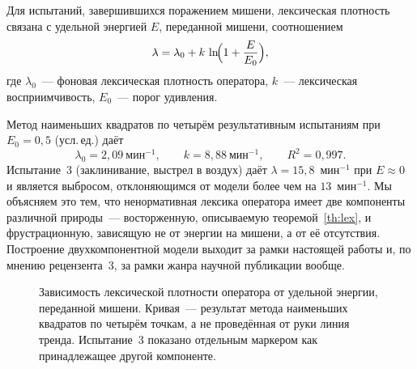 \documentclass[11pt,a4paper]{article}
\begin{document}
\begin{theorem}\label{th:lex}
Для испытаний, завершившихся поражением мишени, лексическая плотность связана с удельной энергией $E$, переданной мишени, соотношением
\[
\lambda=\lambda_0+k\,\ln\!\Bigl(1+\frac{E}{E_0}\Bigr),
\]
где $\lambda_0$~--- фоновая лексическая плотность оператора, $k$~--- лексическая восприимчивость, $E_0$~--- порог удивления.
\end{theorem}

Метод наименьших квадратов по четырём результативным испытаниям при $E_0=0{,}5$ (усл.\,ед.) даёт
\[
\lambda_0=2{,}09~\text{мин}^{-1},\qquad k=8{,}88~\text{мин}^{-1},\qquad R^2=0{,}997 .
\]
Испытание~3 (заклинивание, выстрел в воздух) даёт $\lambda=15{,}8$~мин$^{-1}$ при $E\approx0$ и является выбросом, отклоняющимся от модели более чем на $13$~мин$^{-1}$. Мы объясняем это тем, что ненормативная лексика оператора имеет две компоненты различной природы~--- восторженную, описываемую теоремой~\ref{th:lex}, и фрустрационную, зависящую не от энергии на мишени, а от её отсутствия. Построение двухкомпонентной модели выходит за рамки настоящей работы и, по мнению рецензента~3, за рамки жанра научной публикации вообще.

\begin{figure}[h!]
\centering
{}
\caption{Зависимость лексической плотности оператора от удельной энергии, переданной мишени. Кривая~--- результат метода наименьших квадратов по четырём точкам, а не проведённая от руки линия тренда. Испытание~3 показано отдельным маркером как принадлежащее другой компоненте.}
\label{fig:lex}
\end{figure}
\end{document}
